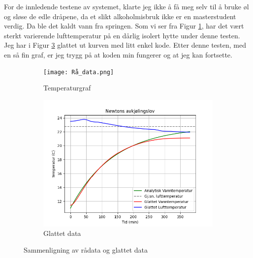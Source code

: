 \documentclass{article}
\begin{document}
For de innledende testene av systemet, klarte jeg ikke å få meg selv til å bruke øl og sløse de edle dråpene, da et slikt alkoholmisbruk ikke er en masterstudent verdig. Da ble det kaldt vann fra springen.
Som vi ser fra Figur \ref{fig:temperaturgraf}, har det vært sterkt varierende lufttemperatur på en dårlig isolert hytte under denne testen. Jeg har i Figur \ref{fig:glattet} glattet ut kurven med litt enkel kode. Etter denne testen, med en så fin graf, er jeg trygg på at koden min fungerer og at jeg kan fortsette.
\begin{figure}[h!]
    \centering
    \begin{subfigure}[b]{0.45\textwidth}
        \centering
        \texttt{[image: Rå\_data.png]}
        \caption{Temperaturgraf}
        \label{fig:temperaturgraf}
    \end{subfigure}
    \hfill
    \begin{subfigure}[b]{0.45\textwidth}
        \centering
        \includegraphics[width=\textwidth]{Glattet_data.png}
        \caption{Glattet data}
        \label{fig:glattet}
    \end{subfigure}
    \caption{Sammenligning av rådata og glattet data}
\end{figure}
\end{document}
